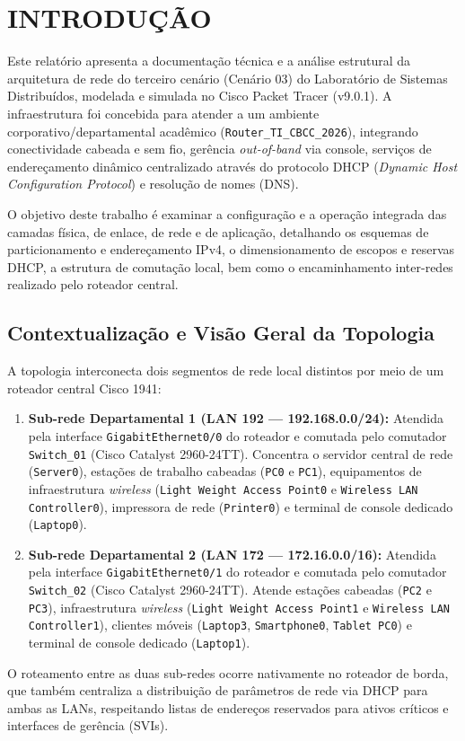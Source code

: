 \section{INTRODUÇÃO}

Este relatório apresenta a documentação técnica e a análise estrutural da arquitetura de rede do terceiro cenário (Cenário 03) do Laboratório de Sistemas Distribuídos, modelada e simulada no Cisco Packet Tracer (v9.0.1). A infraestrutura foi concebida para atender a um ambiente corporativo/departamental acadêmico (\texttt{Router\_TI\_CBCC\_2026}), integrando conectividade cabeada e sem fio, gerência \textit{out-of-band} via console, serviços de endereçamento dinâmico centralizado através do protocolo DHCP (\textit{Dynamic Host Configuration Protocol}) e resolução de nomes (DNS).

O objetivo deste trabalho é examinar a configuração e a operação integrada das camadas física, de enlace, de rede e de aplicação, detalhando os esquemas de particionamento e endereçamento IPv4, o dimensionamento de escopos e reservas DHCP, a estrutura de comutação local, bem como o encaminhamento inter-redes realizado pelo roteador central.

\subsection{Contextualização e Visão Geral da Topologia}

A topologia interconecta dois segmentos de rede local distintos por meio de um roteador central Cisco 1941:
\begin{enumerate}[leftmargin=2em]
  \item \textbf{Sub-rede Departamental 1 (LAN 192 --- 192.168.0.0/24):} Atendida pela interface \texttt{GigabitEthernet0/0} do roteador e comutada pelo comutador \texttt{Switch\_01} (Cisco Catalyst 2960-24TT). Concentra o servidor central de rede (\texttt{Server0}), estações de trabalho cabeadas (\texttt{PC0} e \texttt{PC1}), equipamentos de infraestrutura \textit{wireless} (\texttt{Light Weight Access Point0} e \texttt{Wireless LAN Controller0}), impressora de rede (\texttt{Printer0}) e terminal de console dedicado (\texttt{Laptop0}).
  \item \textbf{Sub-rede Departamental 2 (LAN 172 --- 172.16.0.0/16):} Atendida pela interface \texttt{GigabitEthernet0/1} do roteador e comutada pelo comutador \texttt{Switch\_02} (Cisco Catalyst 2960-24TT). Atende estações cabeadas (\texttt{PC2} e \texttt{PC3}), infraestrutura \textit{wireless} (\texttt{Light Weight Access Point1} e \texttt{Wireless LAN Controller1}), clientes móveis (\texttt{Laptop3}, \texttt{Smartphone0}, \texttt{Tablet PC0}) e terminal de console dedicado (\texttt{Laptop1}).
\end{enumerate}

O roteamento entre as duas sub-redes ocorre nativamente no roteador de borda, que também centraliza a distribuição de parâmetros de rede via DHCP para ambas as LANs, respeitando listas de endereços reservados para ativos críticos e interfaces de gerência (SVIs).
